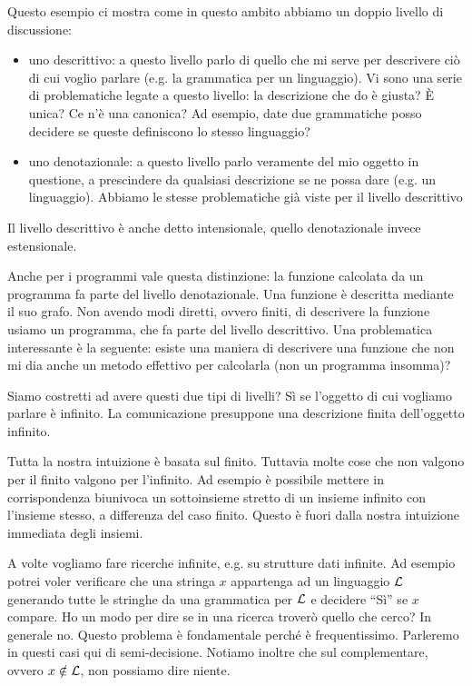 Questo esempio ci mostra come in questo ambito abbiamo un doppio livello di discussione:
\begin{itemize}

    \item uno descrittivo: a questo livello parlo di quello che mi serve per descrivere ciò di cui
    voglio parlare (e.g. la grammatica per un linguaggio). Vi sono una serie di problematiche legate
    a questo livello: la descrizione che do è giusta? È unica? Ce n'è una canonica? Ad esempio,
    date due grammatiche posso decidere se queste definiscono lo stesso linguaggio?

    \item uno denotazionale: a questo livello parlo veramente del mio oggetto in questione, a
    prescindere da qualsiasi descrizione se ne possa dare (e.g. un linguaggio). Abbiamo le stesse
    problematiche già viste per il livello descrittivo 

\end{itemize}

Il livello descrittivo è anche detto intensionale, quello denotazionale invece estensionale.

Anche per i programmi vale questa distinzione: la funzione calcolata da un programma fa parte del
livello denotazionale. Una funzione è descritta mediante il suo grafo. Non avendo modi diretti,
ovvero finiti, di descrivere la funzione usiamo un programma, che fa parte del livello descrittivo.
Una problematica interessante è la seguente: esiste una maniera di descrivere una funzione che non
mi dia anche un metodo effettivo per calcolarla (non un programma insomma)? 

Siamo costretti ad avere questi due tipi di livelli? Sì se l'oggetto di cui vogliamo parlare è
infinito. La comunicazione presuppone una descrizione finita dell'oggetto infinito.

Tutta la nostra intuizione è basata sul finito. Tuttavia molte cose che non valgono per il finito
valgono per l'infinito. Ad esempio è possibile mettere in corrispondenza biunivoca un sottoinsieme
stretto di un insieme infinito con l'insieme stesso, a differenza del caso finito. Questo è fuori
dalla nostra intuizione immediata degli insiemi.

A volte vogliamo fare ricerche infinite, e.g. su strutture dati infinite. Ad esempio potrei voler
verificare che una stringa $x$ appartenga ad un linguaggio $\mathcal{L}$ generando tutte le stringhe da
una grammatica per $\mathcal{L}$ e decidere ``Sì'' se $x$ compare. Ho un modo per dire se in una ricerca
troverò quello che cerco? In generale no. Questo problema è fondamentale perché è
frequentissimo. Parleremo in questi casi qui di semi-decisione. Notiamo inoltre che sul
complementare, ovvero $x \notin \mathcal{L}$, non possiamo dire niente.

